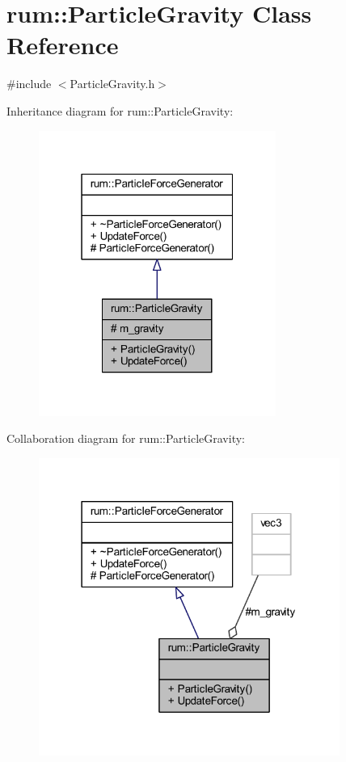 \hypertarget{classrum_1_1_particle_gravity}{}\section{rum\+:\+:Particle\+Gravity Class Reference}
\label{classrum_1_1_particle_gravity}


{\ttfamily \#include $<$Particle\+Gravity.\+h$>$}



Inheritance diagram for rum\+:\+:Particle\+Gravity\+:\nopagebreak
\begin{figure}[H]
\begin{center}
\leavevmode
\includegraphics[width=220pt]{classrum_1_1_particle_gravity__inherit__graph}
\end{center}
\end{figure}


Collaboration diagram for rum\+:\+:Particle\+Gravity\+:\nopagebreak
\begin{figure}[H]
\begin{center}
\leavevmode
\includegraphics[width=279pt]{classrum_1_1_particle_gravity__coll__graph}
\end{center}
\end{figure}
